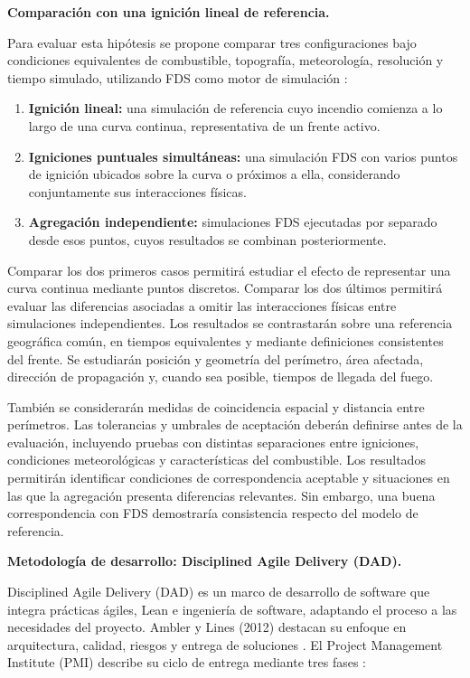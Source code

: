 \textbf{Comparación con una ignición lineal de referencia.}

Para evaluar esta hipótesis se propone comparar tres configuraciones bajo condiciones equivalentes de combustible, topografía, meteorología, resolución y tiempo simulado, utilizando FDS como motor de simulación \cite{fdsnist}:

\begin{enumerate}
    \item \textbf{Ignición lineal:} una simulación de referencia cuyo incendio comienza a lo largo de una curva continua, representativa de un frente activo.

    \item \textbf{Igniciones puntuales simultáneas:} una simulación FDS con varios puntos de ignición ubicados sobre la curva o próximos a ella, considerando conjuntamente sus interacciones físicas.

    \item \textbf{Agregación independiente:} simulaciones FDS ejecutadas por separado desde esos puntos, cuyos resultados se combinan posteriormente.
\end{enumerate}

Comparar los dos primeros casos permitirá estudiar el efecto de representar una curva continua mediante puntos discretos. Comparar los dos últimos permitirá evaluar las diferencias asociadas a omitir las interacciones físicas entre simulaciones independientes. Los resultados se contrastarán sobre una referencia geográfica común, en tiempos equivalentes y mediante definiciones consistentes del frente. Se estudiarán posición y geometría del perímetro, área afectada, dirección de propagación y, cuando sea posible, tiempos de llegada del fuego.

También se considerarán medidas de coincidencia espacial y distancia entre perímetros. Las tolerancias y umbrales de aceptación deberán definirse antes de la evaluación, incluyendo pruebas con distintas separaciones entre igniciones, condiciones meteorológicas y características del combustible. Los resultados permitirán identificar condiciones de correspondencia aceptable y situaciones en las que la agregación presenta diferencias relevantes. Sin embargo, una buena correspondencia con FDS demostraría consistencia respecto del modelo de referencia.

\textbf{Metodología de desarrollo: Disciplined Agile Delivery (DAD).}

Disciplined Agile Delivery (DAD) es un marco de desarrollo de software que integra prácticas ágiles, Lean e ingeniería de software, adaptando el proceso a las necesidades del proyecto. Ambler y Lines (2012) destacan su enfoque en arquitectura, calidad, riesgos y entrega de soluciones \cite{amblerLines2012}. El Project Management Institute (PMI) describe su ciclo de entrega mediante tres fases \cite{pmiDADLifecycle}:

